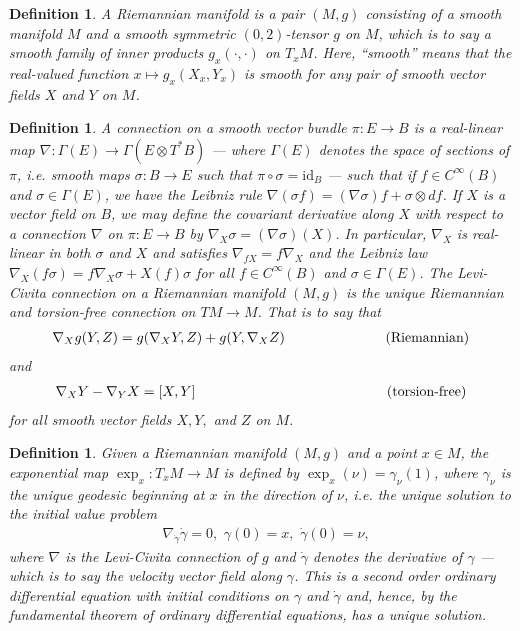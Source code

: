 \documentclass{amsart}          %
\newtheorem{definition}[theorem]{Definition}
\newcommand{\id}{\mathrm{id}}
\begin{document}
\begin{definition}
	A \textup{Riemannian manifold} is a pair $(M,g)$ consisting of a smooth manifold $M$ and a smooth symmetric $(0,2)$-\textup{tensor} $g$ on $M$, which is to say a smooth family of inner products $g_x(\cdot,\cdot)$ on $T_xM$. Here, ``smooth'' means that the real-valued function $x\mapsto g_x(X_x,Y_x)$ is smooth for any pair of smooth vector fields $X$ and $Y$ on $M$.
\end{definition}
\begin{definition}
	A \textup{connection} on a smooth vector bundle $\pi:E\to B$ is a real-linear map $\nabla:\Gamma(E)\to\Gamma(E\otimes T^*B)$ --- where $\Gamma(E)$ denotes the space of sections of $\pi$, i.e. smooth maps $\sigma:B\to E$ such that $\pi\circ\sigma=\id_B$ --- such that if $f\in C^\infty(B)$ and $\sigma\in\Gamma(E)$, we have the Leibniz rule $\nabla(\sigma f)=(\nabla\sigma)f+\sigma\otimes df$. If $X$ is a vector field on $B$, we may define the \textup{covariant derivative along $X$} with respect to a connection $\nabla$ on $\pi:E\to B$ by $\nabla_X\sigma=(\nabla\sigma)(X)$. In particular, $\nabla_X$ is real-linear in both $\sigma$ and $X$ and satisfies $\nabla_{fX}=f\nabla_X$ and the Leibniz law $\nabla_X(f\sigma)=f\nabla_X\sigma+X(f)\sigma$ for all $f\in C^\infty(B)$ and $\sigma\in\Gamma(E)$. The \textup{Levi-Civita connection} on a Riemannian manifold $(M,g)$ is the unique \textup{Riemannian} and \textup{torsion-free} connection on $TM\to M$. That is to say that \begin{align*}
	\nabla_Xg(Y,Z)=g(\nabla_XY,Z)+g(Y,\nabla_XZ)\hspace{1in}\textup{(Riemannian)}
	\end{align*}and\begin{align*}
	\nabla_XY-\nabla_YX=[X,Y]\hspace{1.9in}\textup{(torsion-free)}
	\end{align*}for all smooth vector fields $X,Y,$ and $Z$ on $M$.
\end{definition}
\begin{definition}
	Given a Riemannian manifold $(M,g)$ and a point $x\in M$, the \textup{exponential map} $\exp_x:T_xM\to M$ is defined by $\exp_x(\nu)=\gamma_\nu(1)$, where $\gamma_\nu$ is the unique geodesic beginning at $x$ in the direction of $\nu$, i.e. the unique solution to the initial value problem\begin{align*}
	&\nabla_{\dot{\gamma}}\dot{\gamma}=0,\,\,\gamma(0)=x,\,\,\dot{\gamma}(0)=\nu,
	\end{align*}where $\nabla$ is the Levi-Civita connection of $g$ and $\dot{\gamma}$ denotes the derivative of $\gamma$ --- which is to say the velocity vector field along $\gamma$. This is a second order ordinary differential equation with initial conditions on $\gamma$ and $\dot{\gamma}$ and, hence, by the fundamental theorem of ordinary differential equations, has a unique solution.
\end{definition}
\end{document}
